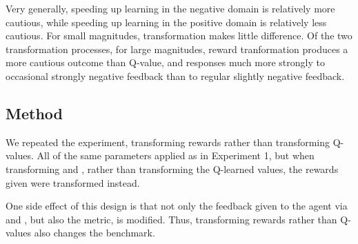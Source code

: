Very generally, speeding up learning in the negative domain is relatively more cautious, while speeding up learning in the positive domain is relatively less cautious. For small magnitudes, transformation makes little difference. Of the two transformation processes, for large magnitudes, reward tranformation produces a more cautious outcome than Q-value, and responses much more strongly to occasional strongly negative feedback than to regular slightly negative feedback.








\subsection{Method}

We repeated the experiment, transforming rewards rather than transforming Q-values. All of the same parameters applied as in Experiment 1, but when transforming \RP{} and \RA{}, rather than transforming the Q-learned values, the rewards given were transformed instead.

One side effect of this design is that not only the feedback given to the agent via \RP{} and \RA{}, but also the \RStar{} metric, is modified. Thus, transforming rewards rather than Q-values also changes the benchmark.